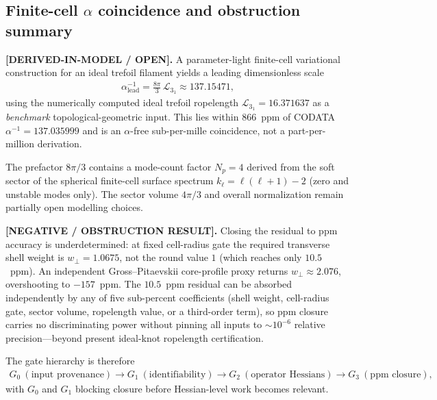 \documentclass[11pt]{article}
\theoremstyle{definition}
\theoremstyle{plain}
\theoremstyle{remark}
\begin{document}
        \subsection{Finite-cell $\alpha$ coincidence and obstruction summary}
            \label{subsec:finite_cell_alpha_obstruction}

            \textbf{[DERIVED-IN-MODEL / OPEN].}
            A parameter-light finite-cell variational construction for an ideal trefoil filament
            yields a leading dimensionless scale
            \begin{align}
                \alpha^{-1}_{\mathrm{lead}}
                =
                \frac{8\pi}{3}\,\mathcal{L}_{3_1}
                \approx 137.15471,
                \label{eq:alpha_lead_finite_cell}
            \end{align}
            using the numerically computed ideal trefoil ropelength
            $\mathcal{L}_{3_1}=16.371637$ as a \emph{benchmark} topological-geometric input.
            This lies within $866$~ppm of CODATA $\alpha^{-1}=137.035999$ and is an
            $\alpha$-free sub-per-mille coincidence, not a part-per-million derivation.

            The prefactor $8\pi/3$ contains a mode-count factor $N_p=4$ derived from the
            soft sector of the spherical finite-cell surface spectrum
            $k_\ell=\ell(\ell+1)-2$ (zero and unstable modes only). The sector volume
            $4\pi/3$ and overall normalization remain partially open modelling choices.

            \textbf{[NEGATIVE / OBSTRUCTION RESULT].}
            Closing the residual to ppm accuracy is underdetermined: at fixed cell-radius
            gate the required transverse shell weight is $w_\perp=1.0675$, not the round
            value $1$ (which reaches only $10.5$~ppm). An independent Gross--Pitaevskii
            core-profile proxy returns $w_\perp\approx 2.076$, overshooting to $-157$~ppm.
            The $10.5$~ppm residual can be absorbed independently by any of five
            sub-percent coefficients (shell weight, cell-radius gate, sector volume,
            ropelength value, or a third-order term), so ppm closure carries no
            discriminating power without pinning all inputs to $\sim10^{-6}$ relative
            precision---beyond present ideal-knot ropelength certification.

            The gate hierarchy is therefore
            \begin{align}
                G_0\ (\text{input provenance})
                \longrightarrow
                G_1\ (\text{identifiability})
                \longrightarrow
                G_2\ (\text{operator Hessians})
                \longrightarrow
                G_3\ (\text{ppm closure}),
                \label{eq:finite_cell_gate_hierarchy}
            \end{align}
            with $G_0$ and $G_1$ blocking closure before Hessian-level work becomes relevant.
\end{document}
